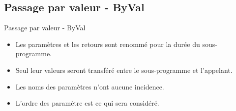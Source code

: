\documentclass[aspectratio=169,usenames,dvipsnames]{beamer}
\begin{document}
    \subsection{Passage par valeur - ByVal}
    \begin{frame}{Passage par valeur - ByVal}
        \begin{itemize}
            \item Les paramètres et les retours sont renommé pour la durée du sous-programme.
            \item Seul leur valeurs seront transféré entre le sous-programme et l'appelant.
            \item Les noms des paramètres n'ont aucune incidence.
            \item L'ordre des paramètre est ce qui sera considéré.
        \end{itemize}
    \end{frame}
\end{document}
